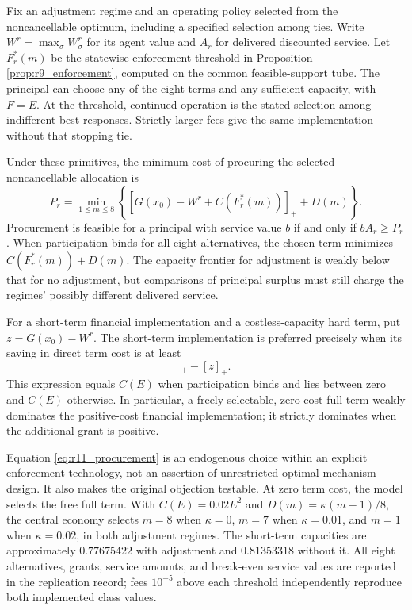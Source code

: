 Fix an adjustment regime and an operating policy selected from the noncancellable optimum, including a specified selection among ties. Write $W^r=\max_\sigma W^r_\sigma$ for its agent value and $A_r$ for delivered discounted service. Let $F_r^*(m)$ be the statewise enforcement threshold in Proposition \ref{prop:r9_enforcement}, computed on the common feasible-support tube. The principal can choose any of the eight terms and any sufficient capacity, with $F=E$. At the threshold, continued operation is the stated selection among indifferent best responses. Strictly larger fees give the same implementation without that stopping tie.

\begin{proposition}
\label{prop:r11_institution}
Under these primitives, the minimum cost of procuring the selected noncancellable allocation is
\begin{equation}
 P_r=\min_{1\leq m\leq8}
 \left\{[G(x_0)-W^r+C(F_r^*(m))]_++D(m)\right\}.
 \label{eq:r11_procurement}
\end{equation}
Procurement is feasible for a principal with service value $b$ if and only if $bA_r\geq P_r$. When participation binds for all eight alternatives, the chosen term minimizes $C(F_r^*(m))+D(m)$. The capacity frontier for adjustment is weakly below that for no adjustment, but comparisons of principal surplus must still charge the regimes' possibly different delivered service.

For a short-term financial implementation and a costless-capacity hard term, put $z=G(x_0)-W^r$. The short-term implementation is preferred precisely when its saving in direct term cost is at least
\begin{equation}
 [z+C(E)]_+-[z]_+.
 \label{eq:r11_institution_comparison}
\end{equation}
This expression equals $C(E)$ when participation binds and lies between zero and $C(E)$ otherwise. In particular, a freely selectable, zero-cost full term weakly dominates the positive-cost financial implementation; it strictly dominates when the additional grant is positive.
\end{proposition}

Equation \eqref{eq:r11_procurement} is an endogenous choice within an explicit enforcement technology, not an assertion of unrestricted optimal mechanism design. It also makes the original objection testable. At zero term cost, the model selects the free full term. With $C(E)=0.02E^2$ and $D(m)=\kappa(m-1)/8$, the central economy selects $m=8$ when $\kappa=0$, $m=7$ when $\kappa=0.01$, and $m=1$ when $\kappa=0.02$, in both adjustment regimes. The short-term capacities are approximately $0.77675422$ with adjustment and $0.81353318$ without it. All eight alternatives, grants, service amounts, and break-even service values are reported in the replication record; fees $10^{-5}$ above each threshold independently reproduce both implemented class values.

